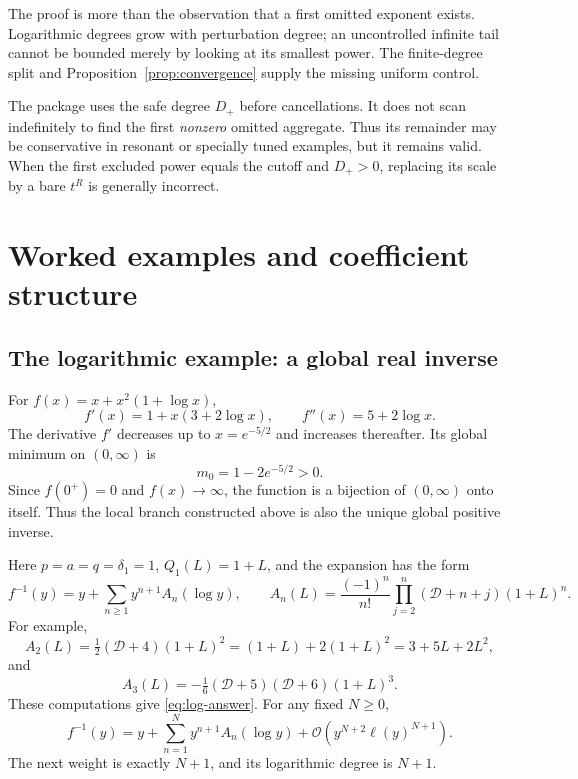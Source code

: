 \documentclass[11pt,a4paper]{article}
\numberwithin{equation}{section}
\theoremstyle{definition}
\newcommand{\OO}{\mathcal O}
\newcommand{\D}{\mathcal D}
\begin{document}
The proof is more than the observation that a first omitted exponent
exists. Logarithmic degrees grow with perturbation degree; an uncontrolled
infinite tail cannot be bounded merely by looking at its smallest power.
The finite-degree split and Proposition~\ref{prop:convergence} supply the
missing uniform control.

The package uses the safe degree $D_+$ before cancellations. It does not
scan indefinitely to find the first \emph{nonzero} omitted aggregate.
Thus its remainder may be conservative in resonant or specially tuned
examples, but it remains valid. When the first excluded power equals the
cutoff and $D_+>0$, replacing its scale by a bare $t^R$ is generally
incorrect.

\section{Worked examples and coefficient structure}\label{sec:examples}

\subsection{The logarithmic example: a global real inverse}
For $f(x)=x+x^2(1+\log x)$,
\begin{equation}
 f'(x)=1+x(3+2\log x),\qquad f''(x)=5+2\log x.
\end{equation}
The derivative $f'$ decreases up to $x=e^{-5/2}$ and increases thereafter.
Its global minimum on $(0,\infty)$ is
\begin{equation}\label{eq:global-slope}
 m_0=1-2e^{-5/2}>0.
\end{equation}
Since $f(0^+)=0$ and $f(x)\to\infty$, the function is a bijection of
$(0,\infty)$ onto itself. Thus the local branch constructed above is
also the unique global positive inverse.

Here $p=a=q=\delta_1=1$, $Q_1(L)=1+L$, and the expansion has the form
\begin{equation}\label{eq:log-polys}
 f^{-1}(y)=y+\sum_{n\ge1}y^{n+1}A_n(\log y),
 \qquad
 A_n(L)=\frac{(-1)^n}{n!}
       \prod_{j=2}^{n}(\D+n+j)(1+L)^n.
\end{equation}
For example,
\[
 A_2(L)=\tfrac12(\D+4)(1+L)^2
        =(1+L)+2(1+L)^2=3+5L+2L^2,
\]
and
\[
 A_3(L)=-\tfrac16(\D+5)(\D+6)(1+L)^3.
\]
These computations give \eqref{eq:log-answer}. For any fixed $N\ge0$,
\begin{equation}\label{eq:log-N-error}
 f^{-1}(y)=y+\sum_{n=1}^Ny^{n+1}A_n(\log y)
          +\OO\!\left(y^{N+2}\ell(y)^{N+1}\right).
\end{equation}
The next weight is exactly $N+1$, and its logarithmic degree is $N+1$.
\end{document}
